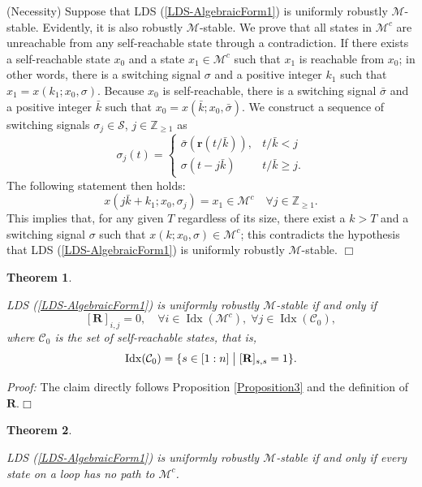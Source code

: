 \documentclass[11pt,onecolumn]{article}
\DeclareMathOperator{\idx}{Idx}
\newtheorem{theorem}{Theorem}
\begin{document}
(Necessity) Suppose that LDS (\ref{LDS-AlgebraicForm1}) is uniformly robustly $\mathcal M$-stable. Evidently, it is also robustly $\mathcal M$-stable. We prove that all states in $\mathcal M^c$ are unreachable from any self-reachable state through a contradiction. If there exists a self-reachable state $ x_0$ and a state $  x_1\in\mathcal M^c$ such that $  x_1$ is reachable from $ x_0$; in other words, there is a switching signal $\sigma$ and a positive integer $k_1$ such that $  x_1=x(k_1;  x_0,\sigma)$. Because $  x_0$ is self-reachable, there is a switching signal $\bar\sigma$ and a positive integer $\bar k$ such that $  x_0=x(\bar k;   x_0,\bar\sigma)$. We construct a sequence of switching signals $\sigma_j\in\mathcal S$, $j\in\mathbb Z_{\geq1}$ as
\[\sigma_j(t)=\left\{
    \begin{array}{ll}
         \bar\sigma(\mathbf r(t/\bar k)), & t/\bar k< j\\
         \sigma (t- j \bar k) &  t/\bar k \geq j.
    \end{array}
\right.\]
The following statement then holds:
\[  x(j\bar k+k_1;  x_0,\sigma_j)=  x_1\in\mathcal M^c\quad \forall j\in\mathbb Z_{\geq1}.\]
This implies that, for any given $T$ regardless of its size, there exist a $k>T$ and a switching signal $\sigma$ such that $  x(k;  x_0,\sigma)\in\mathcal M^c$; this contradicts the hypothesis that  LDS (\ref{LDS-AlgebraicForm1}) is uniformly robustly $\mathcal M$-stable. \hfill$\Box$


\begin{theorem}\label{Theorem3}

   LDS (\ref{LDS-AlgebraicForm1}) is uniformly robustly $\mathcal M$-stable if and only if
   \[[\mathbf R]_{i,j}=0,\quad \forall i\in\idx(\mathcal M^c),\;\forall j\in\idx(\mathcal C_0), \]
   where $\mathcal C_0$ is the set of self-reachable states, that is,
   \[\idx(\mathcal C_0)=\{s\in[1:n]\bigm|[\mathbf R]_{s,s}=1 \}.\]

\end{theorem}

{\it Proof:} The claim directly follows Proposition \ref{Proposition3} and the definition of $\mathbf R$.\hfill$\Box$


\begin{theorem}\label{Theorem4}

    LDS (\ref{LDS-AlgebraicForm1}) is uniformly robustly $\mathcal M$-stable if and only if every state on a loop has no path to $\mathcal M^c$.
\end{theorem}
\end{document}
